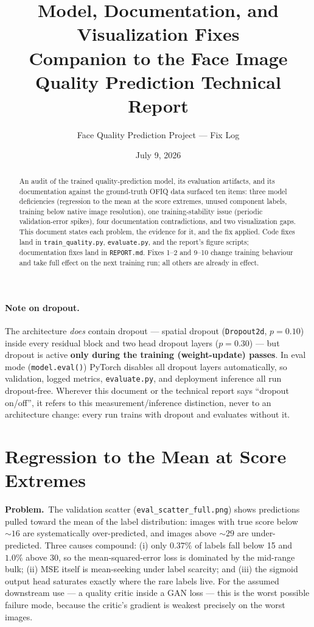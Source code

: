 \documentclass[12pt, letterpaper]{article}
\title{\textbf{Model, Documentation, and Visualization Fixes}\\[4pt]
\large Companion to the Face Image Quality Prediction Technical Report}
\author{Face Quality Prediction Project --- Fix Log}
\date{July 9, 2026}
\newcommand{\code}[1]{\texttt{#1}}
\newcommand{\problem}[1]{\textbf{Problem.}~#1}
\begin{document}
\maketitle

\begin{abstract}
\noindent
An audit of the trained quality-prediction model, its evaluation artifacts, and its
documentation against the ground-truth OFIQ data surfaced ten items: three model
deficiencies (regression to the mean at the score extremes, unused component labels,
training below native image resolution), one training-stability issue (periodic
validation-error spikes), four documentation contradictions, and two visualization
gaps. This document states each problem, the evidence for it, and the fix applied.
Code fixes land in \code{train\_quality.py}, \code{evaluate.py}, and the report's
figure scripts; documentation fixes land in \code{REPORT.md}. Fixes 1--2 and 9--10
change training behaviour and take full effect on the next training run; all others
are already in effect.
\end{abstract}

\paragraph{Note on dropout.}
The architecture \emph{does} contain dropout --- spatial dropout (\code{Dropout2d},
$p=0.10$) inside every residual block and two head dropout layers ($p=0.30$) --- but
dropout is active \textbf{only during the training (weight-update) passes}. In eval
mode (\code{model.eval()}) PyTorch disables all dropout layers automatically, so
validation, logged metrics, \code{evaluate.py}, and deployment inference all run
dropout-free. Wherever this document or the technical report says ``dropout on/off'',
it refers to this measurement/inference distinction, never to an architecture change:
every run trains with dropout and evaluates without it.

\section{Regression to the Mean at Score Extremes}

\problem{The validation scatter (\code{eval\_scatter\_full.png}) shows predictions pulled
toward the mean of the label distribution: images with true score below ${\sim}16$ are
systematically over-predicted, and images above ${\sim}29$ are under-predicted. Three
causes compound: (i) only $0.37\%$ of labels fall below 15 and $1.0\%$ above 30, so the
mean-squared-error loss is dominated by the mid-range bulk; (ii) MSE itself is
mean-seeking under label scarcity; and (iii) the sigmoid output head saturates exactly
where the rare labels live. For the assumed downstream use --- a quality critic inside a
GAN loss --- this is the worst possible failure mode, because the critic's gradient is
weakest precisely on the worst images.}
\end{document}
